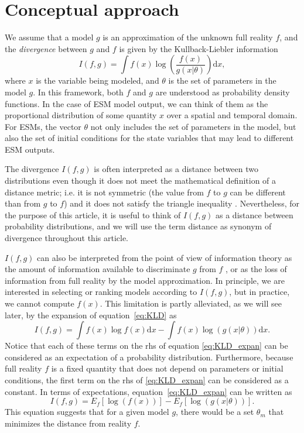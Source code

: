 \documentclass[gmd, manuscript]{copernicus}
\newcommand{\dd}{\mathrm{d}}
\begin{document}
\section{Conceptual approach}
We assume that a model $g$ is an approximation of the unknown full reality $f$, and the \emph{divergence} between $g$ and $f$ is given by the Kullback-Liebler information
\begin{equation} \label{eq:KLD}
I(f, g) = \int f(x) \log \left( \frac{f(x)}{g(x | \theta)} \right) \dd x,
\end{equation}
where $x$ is the variable being modeled, and $\theta$ is the set of parameters in the model $g$. 
In this framework, both $f$ and $g$ are understood as probability density functions. In the case of ESM model output, we can think of them as the proportional distribution of some quantity $x$ over a spatial and temporal domain. 
For ESMs, the vector $\theta$ not only includes the set of parameters in the model, but also the set of initial conditions for the state variables that may lead to different ESM outputs. 

The divergence $I(f, g)$ is often interpreted as a distance between two distributions even though it does not meet the mathematical definition of a distance metric; i.e. it is not symmetric (the value from $f$ to $g$ can be different than from $g$ to $f$) and it does not satisfy the triangle inequality \citep{Cover2006}. 
Nevertheless, for the purpose of this article, it is useful to think of $I(f, g)$ as a distance between probability distributions, and we will use the term distance as synonym of divergence throughout this article. 

$I(f, g)$ can also be interpreted from the point of view of information theory as the amount of information available to discriminate $g$ from $f$ \citep{Kullback1951}, or as the loss of information from full reality by the model approximation. In principle, we are interested in selecting or ranking models according to $I(f, g)$, but in practice, we cannot compute $f(x)$. 
This limitation is partly alleviated, as we will see later, by the expansion of equation~\ref{eq:KLD} as
\begin{equation} \label{eq:KLD_expan}
I(f, g) = \int f(x) \log f(x) \dd x - \int f(x) \log (g(x | \theta)) \dd x.
\end{equation}
Notice that each of these terms on the rhs of equation \ref{eq:KLD_expan} can be considered as an expectation of a probability distribution. Furthermore, because full reality $f$ is a fixed quantity that does not depend on parameters or initial conditions, the first term on the rhs of \ref{eq:KLD_expan} can be considered as a constant. In terms of expectations, equation~\ref{eq:KLD_expan} can be written as
\begin{equation}\label{eq:KLD_expect}
I(f, g)  = E_f[ \log(f(x)) ] - E_f [ \log (g(x | \theta)) ].
\end{equation}
This equation suggests that for a given model $g$, there would be a set $\theta_m$ that minimizes the distance from reality $f$. 
\end{document}
